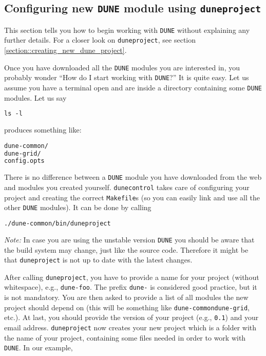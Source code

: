 \documentclass[11pt,a4paper,headinclude,footinclude,DIV16,normalheadings]{scrartcl}
\newcommand{\dune}{\texttt{DUNE}\xspace}
\newcommand{\dunecommon}{\texttt{dune-common}\xspace}
\newcommand{\dunegrid}{\texttt{dune-grid}\xspace}
\newcommand{\dunecontrol}{\texttt{dunecontrol}\xspace}
\newcommand{\duneproject}{\texttt{duneproject}\xspace}
\begin{document}
\subsection{Configuring new \dune module using \duneproject}\label{section::creating_dune_module}

This section tells you how to begin working with \dune without explaining any
further details. For a closer look on \duneproject, see section
\ref{section::creating_new_dune_project}.

Once you have downloaded all the \dune modules you are interested in, you probably
wonder ``How do I start working with \dune?'' It is quite easy.
Let us assume you have a terminal open and are inside a directory containing
some \dune modules. Let us say
 
\begin{lstlisting}[language=make]
ls -l
\end{lstlisting}
produces something like:

\begin{lstlisting}[language=make]
dune-common/
dune-grid/
config.opts
\end{lstlisting}

There is no difference between a \dune module you have downloaded from
the web and modules you created yourself.
\dunecontrol takes care of configuring your project and creating the
correct \texttt{Makefile}s (so you can easily link and use all the other \dune
modules). It can be done by calling
 
\begin{lstlisting}[language=make]
./dune-common/bin/duneproject
\end{lstlisting}

\emph{Note:} In case you are using the unstable version
\dune you should be aware that the build system may change,
just like the source code. Therefore it might be that
\texttt{duneproject} is not up to date with the latest changes.

After calling \duneproject, you have to provide a name for your project
(without whitespace), e.g., \texttt{dune-foo}. 
The prefix \texttt{dune-} is considered good practice, but it is not
mandatory.
You are then asked to provide a
list of all modules the new project should depend on (this will be
something like \dunecommon \dunegrid, etc.). At last, you should provide
the version of your project (e.g., \texttt{0.1}) and your email address.
\duneproject now creates your new project which is a folder with the name of your project,
containing some files needed in order to work with \dune.
In our example,
 
\end{document}
